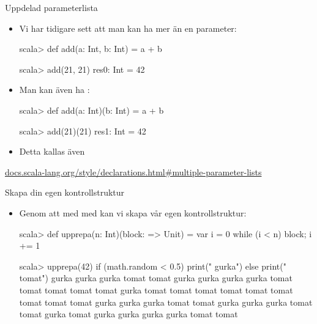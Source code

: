 \begin{Slide}{Uppdelad parameterlista}
\begin{itemize}
\item Vi har tidigare sett att man kan ha mer än en parameter:
\begin{REPLnonum}
scala> def add(a: Int, b: Int) = a + b

scala> add(21, 21)
res0: Int = 42
\end{REPLnonum}

\item Man kan även ha  :
\begin{REPLnonum}

scala> def add(a: Int)(b: Int) = a + b

scala> add(21)(21)
res1: Int = 42
\end{REPLnonum}
\item Detta kallas även  
\end{itemize}
\href{http://docs.scala-lang.org/style/declarations.html#multiple-parameter-lists}{\SlideFontTiny docs.scala-lang.org/style/declarations.html\#multiple-parameter-lists}
\end{Slide}


\begin{Slide}{Skapa din egen kontrollstruktur}
\begin{itemize}
\item Genom att   med  med  kan vi skapa vår egen kontrollstruktur:
\begin{REPLnonum}
scala> def upprepa(n: Int)(block: => Unit) = {
         var i = 0
         while (i < n) { block; i += 1 }
       }

scala> upprepa(42){
         if (math.random < 0.5) {
           print(" gurka")
         } else {
           print(" tomat")
         }
       }
 gurka gurka gurka tomat tomat gurka gurka gurka gurka tomat tomat tomat tomat tomat gurka tomat tomat tomat tomat tomat tomat tomat tomat tomat gurka gurka gurka tomat tomat gurka gurka gurka tomat tomat gurka tomat gurka gurka gurka gurka tomat tomat
\end{REPLnonum}
\end{itemize}
\end{Slide}


